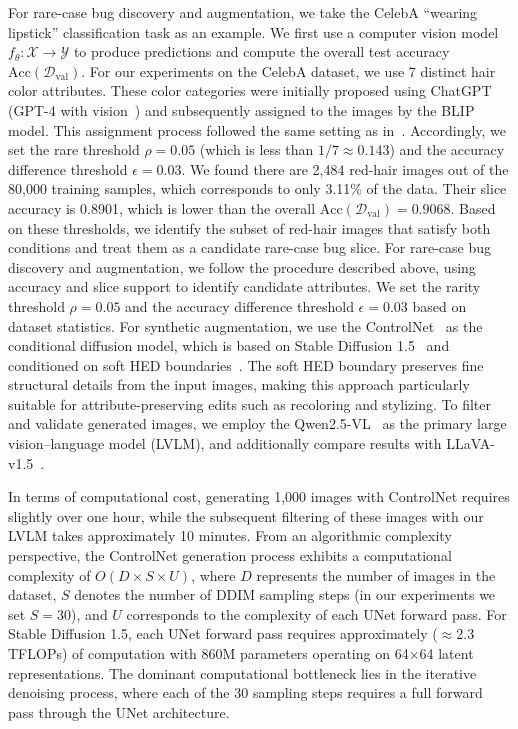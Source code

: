 \documentclass[10pt]{article} %
\newcommand{\controlnet}{ControlNet\xspace}
\newcommand{\qwen}{Qwen2.5-VL\xspace}
\newcommand{\llava}{LLaVA-v1.5\xspace}
\begin{document}
For rare-case bug discovery and augmentation, we take the CelebA “wearing lipstick” classification task as an example. We first use a computer vision model \(f_\theta\colon \mathcal{X}\to\mathcal{Y}\) to produce predictions and compute the overall test accuracy \(\mathrm{Acc}(\mathcal{D}_{\mathrm{val}})\). 
For our experiments on the CelebA dataset, we use 7 distinct hair color attributes. These color categories were initially proposed using ChatGPT (GPT-4 with vision~\citep{openai2023gpt4}) and subsequently assigned to the images by the BLIP~\citep{li2022blip} model. This assignment process followed the same setting as in~\citep{chen2023hibug}. Accordingly, we set the rare threshold \(\rho = 0.05\) (which is less than \(1/7 \approx 0.143\)) and the accuracy difference threshold \(\epsilon = 0.03\). We found there are 2{,}484 red-hair images out of the 80{,}000 training samples, which corresponds to only 3.11\% of the data. Their slice accuracy is 0.8901, which is lower than the overall \(\mathrm{Acc}(\mathcal{D}_{\mathrm{val}}) = 0.9068\). Based on these thresholds, we identify the subset of red-hair images that satisfy both conditions and treat them as a candidate rare-case bug slice.
For rare-case bug discovery and augmentation, we follow the procedure described above, using accuracy and slice support to identify candidate attributes. We set the rarity threshold \(\rho = 0.05\) and the accuracy difference threshold \(\epsilon = 0.03\) based on dataset statistics. For synthetic augmentation, we use the \controlnet~\citep{zhang2023adding} as the conditional diffusion model, which is based on Stable Diffusion 1.5~\citep{rombach2022high} and conditioned on soft HED boundaries~\citep{xie2015holistically}. The soft HED boundary preserves fine structural details from the input images, making this approach particularly suitable for attribute-preserving edits such as recoloring and stylizing. To filter and validate generated images, we employ the \qwen~\citep{bai2025qwen25vl} as the primary large vision--language model (LVLM), and additionally compare results with \llava~\citep{liu2023improvedllava}.

In terms of computational cost, generating 1,000 images with ControlNet requires slightly over one hour, while the subsequent filtering of these images with our LVLM takes approximately 10 minutes. From an algorithmic complexity perspective, the ControlNet generation process exhibits a computational complexity of $O(D \times S \times U)$, where $D$ represents the number of images in the dataset, $S$ denotes the number of DDIM sampling steps (in our experiments we set $S=30$), and $U$ corresponds to the complexity of each UNet forward pass. For Stable Diffusion 1.5, each UNet forward pass requires approximately (\(\approx\)2.3 TFLOPs) of computation with 860M parameters operating on 64×64 latent representations. The dominant computational bottleneck lies in the iterative denoising process, where each of the 30 sampling steps requires a full forward pass through the UNet architecture. 
\end{document}

